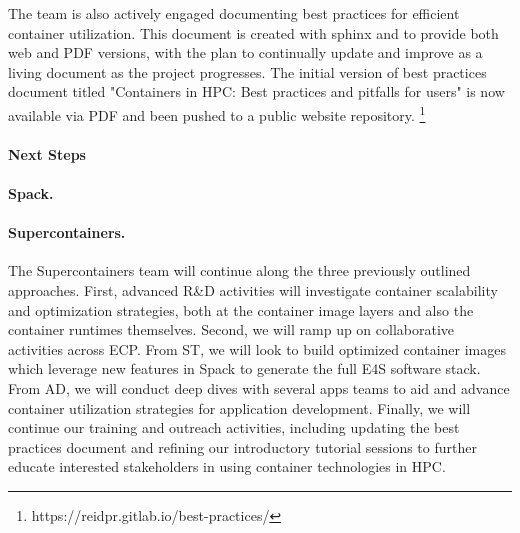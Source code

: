 The team is also actively engaged documenting best practices for efficient container utilization. This document is created with sphinx and to provide both web and PDF versions, with the plan to continually update and improve as a living document as the project progresses.
The initial version of best practices document titled "Containers in HPC: Best practices and pitfalls for users" is now available via PDF and been pushed to a public website repository. \footnote{https://reidpr.gitlab.io/best-practices/}

\paragraph{Next Steps}

\paragraph{Spack.}

\paragraph{Supercontainers.}

The Supercontainers team will continue along the three previously outlined approaches. First, advanced R\&D activities will investigate container scalability and optimization strategies, both at the container image layers and also the container runtimes themselves.  Second, we will ramp up on collaborative activities across ECP. From ST, we will look to build optimized container images which leverage new features in Spack to generate the full E4S software stack. From AD, we will conduct deep dives with several apps teams to aid and advance container utilization strategies for application development. Finally, we will continue our training and outreach activities, including updating the best practices document and refining our introductory tutorial sessions to further educate interested stakeholders in using container technologies in HPC.

